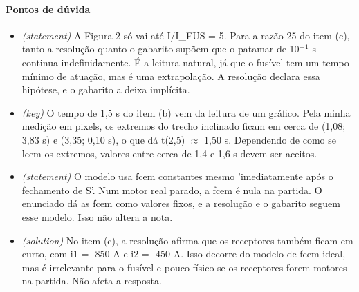 \documentclass{article}%
\begin{document}
\paragraph{Pontos de dúvida}%
\begin{itemize}%
\item%
\textit{(statement)} A Figura 2 só vai até I/I\_FUS = 5. Para a razão 25 do item (c), tanto a resolução quanto o gabarito supõem que o patamar de 10$^{-}$$^{1}$ s continua indefinidamente. É a leitura natural, já que o fusível tem um tempo mínimo de atuação, mas é uma extrapolação. A resolução declara essa hipótese, e o gabarito a deixa implícita.%
\item%
\textit{(key)} O tempo de 1,5 s do item (b) vem da leitura de um gráfico. Pela minha medição em pixels, os extremos do trecho inclinado ficam em cerca de (1,08; 3,83 s) e (3,35; 0,10 s), o que dá t(2,5) $\approx$ 1,50 s. Dependendo de como se leem os extremos, valores entre cerca de 1,4 e 1,6 s devem ser aceitos.%
\item%
\textit{(statement)} O modelo usa fcem constantes mesmo 'imediatamente após o fechamento de S'. Num motor real parado, a fcem é nula na partida. O enunciado dá as fcem como valores fixos, e a resolução e o gabarito seguem esse modelo. Isso não altera a nota.%
\item%
\textit{(solution)} No item (c), a resolução afirma que os receptores também ficam em curto, com i1 = -850 A e i2 = -450 A. Isso decorre do modelo de fcem ideal, mas é irrelevante para o fusível e pouco físico se os receptores forem motores na partida. Não afeta a resposta.%
\end{itemize}%
\end{document}
